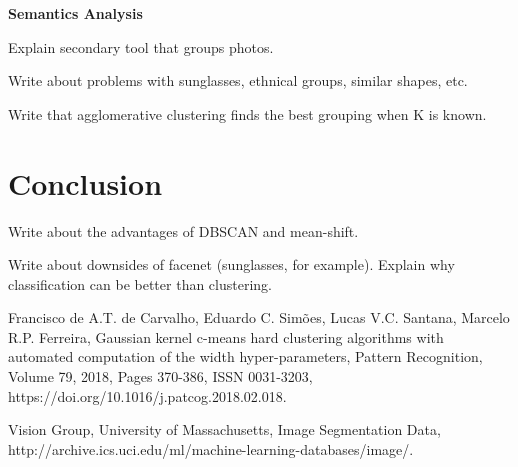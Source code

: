 \documentclass[conference]{IEEEtran}
\begin{document}
\textbf{Semantics Analysis}

Explain secondary tool that groups photos.

Write about problems with sunglasses, ethnical groups, similar shapes, etc.

Write that agglomerative clustering finds the best grouping when K is known.

\section{Conclusion}

Write about the advantages of DBSCAN and mean-shift.

Write about downsides of facenet (sunglasses, for example).
Explain why classification can be better than clustering.

\begin{thebibliography}{00}
 Francisco de A.T. de Carvalho, Eduardo C. Simões, Lucas V.C. Santana, Marcelo R.P. Ferreira,
Gaussian kernel c-means hard clustering algorithms with automated computation of the width hyper-parameters,
Pattern Recognition,
Volume 79,
2018,
Pages 370-386,
ISSN 0031-3203,
https://doi.org/10.1016/j.patcog.2018.02.018.

 Vision Group, University of Massachusetts, 
Image Segmentation Data,
http://archive.ics.uci.edu/ml/machine-learning-databases/image/.

\end{thebibliography}
\end{document}
